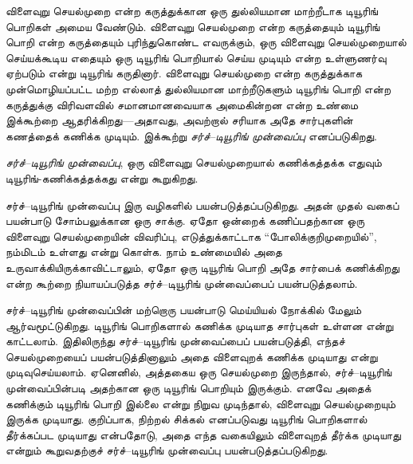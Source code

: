 \documentclass[../../../include/open-logic-section]{subfiles}
\begin{document}


விளைவுறு செயல்முறை என்ற கருத்துக்கான ஒரு துல்லியமான மாற்றீடாக
டியூரிங் பொறிகள் அமைய வேண்டும். விளைவுறு செயல்முறை என்ற கருத்தையும்
டியூரிங் பொறி என்ற கருத்தையும் புரிந்துகொண்ட எவருக்கும், ஒரு விளைவுறு
செயல்முறையால் செய்யக்கூடிய எதையும் ஒரு டியூரிங் பொறியால் செய்ய முடியும்
என்ற உள்ளுணர்வு ஏற்படும் என்று டியூரிங் கருதினார். விளைவுறு செயல்முறை
என்ற கருத்துக்காக முன்மொழியப்பட்ட மற்ற எல்லாத் துல்லியமான மாற்றீடுகளும்
டியூரிங் பொறி என்ற கருத்துக்கு விரிவளவில் சமானமானவையாக அமைகின்றன
என்ற உண்மை இக்கூற்றை ஆதரிக்கிறது---அதாவது, அவற்றால் சரியாக அதே
சார்புகளின் கணத்தைக் கணிக்க முடியும். இக்கூற்று
\emph{சர்ச்--டியூரிங் முன்வைப்பு} எனப்படுகிறது.

\begin{defn}[சர்ச்--டியூரிங் முன்வைப்பு]
\emph{சர்ச்--டியூரிங் முன்வைப்பு}, ஒரு விளைவுறு செயல்முறையால்
கணிக்கத்தக்க எதுவும் டியூரிங்-கணிக்கத்தக்கது என்று கூறுகிறது.
\end{defn}

சர்ச்--டியூரிங் முன்வைப்பு இரு வழிகளில் பயன்படுத்தப்படுகிறது. அதன்
முதல் வகைப் பயன்பாடு சோம்பலுக்கான ஒரு சாக்கு. ஏதோ ஒன்றைக் கணிப்பதற்கான
ஒரு விளைவுறு செயல்முறையின் விவரிப்பு, எடுத்துக்காட்டாக
``போலிக்குறிமுறையில்'', நம்மிடம் உள்ளது என்று கொள்க. நாம் உண்மையில்
அதை உருவாக்கியிருக்காவிட்டாலும், ஏதோ ஒரு டியூரிங் பொறி அதே சார்பைக்
கணிக்கிறது என்ற கூற்றை நியாயப்படுத்த சர்ச்--டியூரிங் முன்வைப்பைப்
பயன்படுத்தலாம்.

சர்ச்--டியூரிங் முன்வைப்பின் மற்றொரு பயன்பாடு மெய்யியல் நோக்கில் மேலும்
ஆர்வமூட்டுகிறது. டியூரிங் பொறிகளால் கணிக்க முடியாத சார்புகள் உள்ளன
என்று காட்டலாம். இதிலிருந்து சர்ச்--டியூரிங் முன்வைப்பைப் பயன்படுத்தி,
எந்தச் செயல்முறையைப் பயன்படுத்தினாலும் அதை விளைவுறக் கணிக்க முடியாது
என்று முடிவுசெய்யலாம். ஏனெனில், அத்தகைய ஒரு செயல்முறை இருந்தால்,
சர்ச்--டியூரிங் முன்வைப்பின்படி அதற்கான ஒரு டியூரிங் பொறியும் இருக்கும்.
எனவே அதைக் கணிக்கும் டியூரிங் பொறி இல்லை என்று நிறுவ முடிந்தால்,
விளைவுறு செயல்முறையும் இருக்க முடியாது. குறிப்பாக, நிற்றல் சிக்கல்
எனப்படுவது டியூரிங் பொறிகளால் தீர்க்கப்பட முடியாது என்பதோடு, அதை
எந்த வகையிலும் விளைவுறத் தீர்க்க முடியாது என்றும் கூறுவதற்குச்
சர்ச்--டியூரிங் முன்வைப்பு பயன்படுத்தப்படுகிறது.
\end{document}
